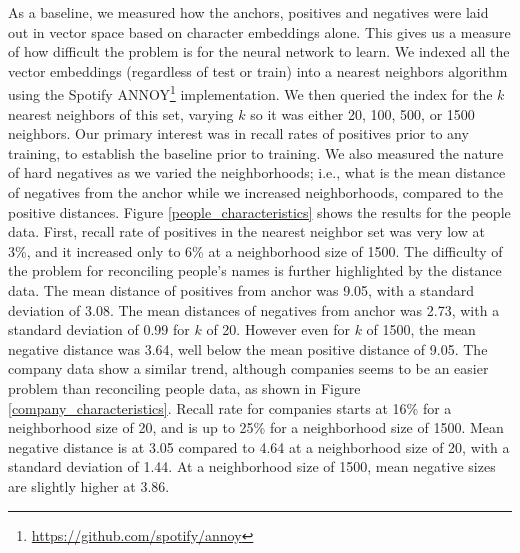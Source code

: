  As a baseline, we measured how the anchors, positives and negatives were laid out in vector space based on character embeddings alone.  This gives us a measure of how difficult the problem is for the neural network to learn.  We indexed all the vector embeddings (regardless of test or train) into a nearest neighbors algorithm using the Spotify ANNOY\footnote{\url{https://github.com/spotify/annoy}} implementation.  We then queried the index for the $k$ nearest neighbors of this set, varying $k$ so it was either 20, 100, 500, or 1500 neighbors.  Our primary interest was in recall rates of positives prior to any training, to establish the baseline prior to training.  We also measured the nature of hard negatives as we varied the neighborhoods; i.e., what is the mean distance of negatives from the anchor while we increased neighborhoods, compared to the positive distances.  Figure \ref{people_characteristics} shows the results for the people data.  First, recall rate of positives in the nearest neighbor set was very low at 3\%, and it increased only to 6\% at a neighborhood size of 1500.  The difficulty of the problem for reconciling people's names is further highlighted by the distance data.  The mean distance of positives from anchor was 9.05, with a standard deviation of 3.08.  The mean distances of negatives from anchor was 2.73, with a standard deviation of 0.99 for $k$ of 20.  However even for $k$ of 1500, the mean negative distance was 3.64, well below the mean positive distance of 9.05.  The company data show a similar trend, although companies seems to be an easier problem than reconciling people data, as shown in Figure \ref{company_characteristics}.  Recall rate for companies starts at 16\% for a neighborhood size of 20, and is up to 25\% for a neighborhood size of 1500.  Mean negative distance is at 3.05 compared to 4.64 at a neighborhood size of 20, with a standard deviation of 1.44.  At a neighborhood size of 1500, mean negative sizes are slightly higher at 3.86. 

